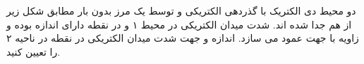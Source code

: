 \begin{ELexample}{}

دو محیط دی الکتریک با گذردهی الکتریکی  و  توسط یک مرز بدون بار مطابق شکل زیر از هم جدا شده اند. شدت میدان الکتریکی در محیط ۱ و در نقطه  دارای اندازه  بوده و زاویه  با جهت عمود می سازد. اندازه و جهت شدت میدان الکتریکی در نقطه  در ناحیه ۲ را تعیین کنید.


\begin{ELsolution}


\begin{ELimportant}{}


\end{ELimportant}


\begin{ELimportant}{}


\end{ELimportant}

\end{ELsolution}

\end{ELexample}

\ELhold


